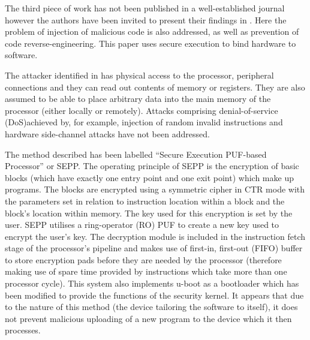 The third piece of work \cite{Kleber2015} has not been published in a well-established journal however the authors have been invited to present their findings in \cite{Kleber2015a}. Here the problem of injection of malicious code is also addressed, as well as prevention of code reverse-engineering. This paper uses secure execution to bind hardware to software.

The attacker identified in \cite{Kleber2015} has physical access to the processor, peripheral connections and they can read out contents of memory or registers. They are also assumed to be able to place arbitrary data into the main memory of the processor (either locally or remotely). Attacks comprising denial-of-service (DoS)achieved by, for example, injection of random invalid instructions and hardware side-channel attacks have not been addressed.

The method described has been labelled ``Secure Execution PUF-based Processor'' or SEPP. The operating principle of SEPP is the encryption of basic blocks (which have exactly one entry point and one exit point) which make up programs. The blocks are encrypted using a symmetric cipher in CTR mode with the parameters set in relation to instruction location within a block and the block's location within memory. The key used for this encryption is set by the user. SEPP utilises a ring-operator (RO) PUF to create a new key used to encrypt the user's key. The decryption module is included in the instruction fetch stage of the processor's pipeline and makes use of first-in, first-out (FIFO) buffer to store encryption pads before they are needed by the processor (therefore making use of spare time provided by instructions which take more than one processor cycle). This system also implements u-boot as a bootloader which has been modified to provide the functions of the security kernel. It appears that due to the nature of this method (the device tailoring the software to itself), it does not prevent malicious uploading of a new program to the device which it then processes.

\ifnotesincluded
{}
\fi


